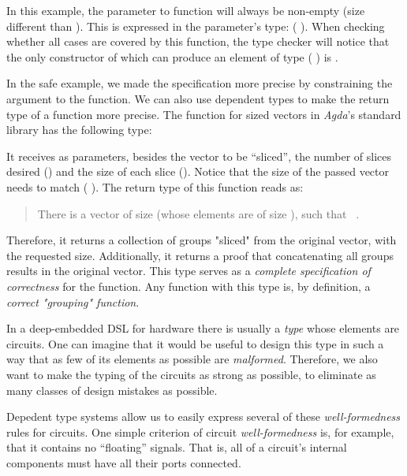     In this example, the parameter to  function will always be non-empty (size different than ).
    This is expressed in the parameter's type:   ( ).
    When checking whether all cases are covered by this function, the type checker will notice that
    the only constructor of  which can produce an element of type   ( ) is .

    In the safe  example, we made the specification more precise by constraining the argument to the function.
    We can also use dependent types to make the return type of a function more precise.
    The  function for sized vectors in \emph{Agda}'s standard library has the following type:

    \begin{listing}[h]
    \end{listing}

    It receives as parameters, besides the vector to be ``sliced'',
    the number of slices desired () and the size of each slice ().
    Notice that the size of the passed vector needs to match ( \AF{*} ).
    The return type of this function reads as:
    \begin{quote}
        There is a vector  of size 
        (whose elements are of size ), such that \texttt{   }.
    \end{quote}

    Therefore, it returns a collection of groups "sliced" from the original vector, with the requested size.
    Additionally, it returns a proof that concatenating all groups results in the original vector.
    This type serves as a \emph{complete specification of correctness} for the function.
    Any function with this type is, by definition, a \emph{correct "grouping" function}.

    In a deep-embedded \acs{DSL} for hardware there is usually a \emph{type} whose elements are circuits.
    One can imagine that it would be useful to design this type
    in such a way that as few of its elements as possible are \emph{malformed}.
    Therefore, we also want to make the typing of the circuits as strong as possible,
    to eliminate as many classes of design mistakes as possible.

    Depedent type systems allow us to easily express several of these \emph{well-formedness} rules for circuits.
    One simple criterion of circuit \emph{well-formedness} is, for example, that it contains no ``floating'' signals.
    That is, all of a circuit's internal components must have all their ports connected.

